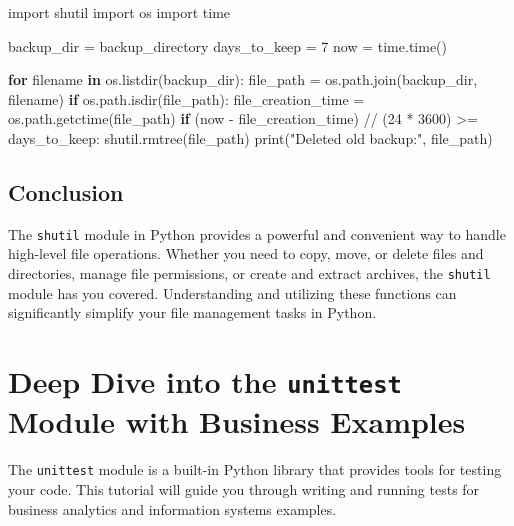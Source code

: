 \documentclass[
  letterpaper,
  DIV=11,
  numbers=noendperiod]{scrreprt}
\newenvironment{Shaded}{\begin{snugshade}}{\end{snugshade}}
\newcommand{\BuiltInTok}[1]{\textcolor[rgb]{0.00,0.23,0.31}{#1}}
\newcommand{\ControlFlowTok}[1]{\textcolor[rgb]{0.00,0.23,0.31}{\textbf{#1}}}
\newcommand{\DecValTok}[1]{\textcolor[rgb]{0.68,0.00,0.00}{#1}}
\newcommand{\ImportTok}[1]{\textcolor[rgb]{0.00,0.46,0.62}{#1}}
\newcommand{\KeywordTok}[1]{\textcolor[rgb]{0.00,0.23,0.31}{\textbf{#1}}}
\newcommand{\NormalTok}[1]{\textcolor[rgb]{0.00,0.23,0.31}{#1}}
\newcommand{\OperatorTok}[1]{\textcolor[rgb]{0.37,0.37,0.37}{#1}}
\newcommand{\StringTok}[1]{\textcolor[rgb]{0.13,0.47,0.30}{#1}}
\begin{document}
\begin{Shaded}
\begin{Highlighting}[]
\ImportTok{import}\NormalTok{ shutil}
\ImportTok{import}\NormalTok{ os}
\ImportTok{import}\NormalTok{ time}

\NormalTok{backup\_dir }\OperatorTok{=} \StringTok{\textquotesingle{}backup\_directory\textquotesingle{}}
\NormalTok{days\_to\_keep }\OperatorTok{=} \DecValTok{7}
\NormalTok{now }\OperatorTok{=}\NormalTok{ time.time()}

\ControlFlowTok{for}\NormalTok{ filename }\KeywordTok{in}\NormalTok{ os.listdir(backup\_dir):}
\NormalTok{    file\_path }\OperatorTok{=}\NormalTok{ os.path.join(backup\_dir, filename)}
    \ControlFlowTok{if}\NormalTok{ os.path.isdir(file\_path):}
\NormalTok{        file\_creation\_time }\OperatorTok{=}\NormalTok{ os.path.getctime(file\_path)}
        \ControlFlowTok{if}\NormalTok{ (now }\OperatorTok{{-}}\NormalTok{ file\_creation\_time) }\OperatorTok{//}\NormalTok{ (}\DecValTok{24} \OperatorTok{*} \DecValTok{3600}\NormalTok{) }\OperatorTok{\textgreater{}=}\NormalTok{ days\_to\_keep:}
\NormalTok{            shutil.rmtree(file\_path)}
            \BuiltInTok{print}\NormalTok{(}\StringTok{"Deleted old backup:"}\NormalTok{, file\_path)}
\end{Highlighting}
\end{Shaded}

\section{Conclusion}\label{conclusion-22}

The \texttt{shutil} module in Python provides a powerful and convenient
way to handle high-level file operations. Whether you need to copy,
move, or delete files and directories, manage file permissions, or
create and extract archives, the \texttt{shutil} module has you covered.
Understanding and utilizing these functions can significantly simplify
your file management tasks in Python.


\chapter{\texorpdfstring{Deep Dive into the \texttt{unittest} Module
with Business
Examples}{Deep Dive into the unittest Module with Business Examples}}\label{deep-dive-into-the-unittest-module-with-business-examples}

The \texttt{unittest} module is a built-in Python library that provides
tools for testing your code. This tutorial will guide you through
writing and running tests for business analytics and information systems
examples.
\end{document}

